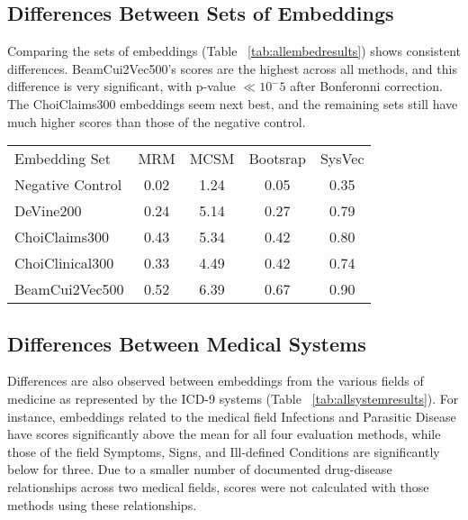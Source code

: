 \documentclass[11pt,a4paper]{article}
\begin{document}
\subsection{Differences Between Sets of Embeddings}
Comparing the sets of embeddings (Table ~\ref{tab:allembedresults}) shows consistent differences. BeamCui2Vec500's scores are the highest across all methods, and this difference is very significant, with p-value $\ll 10^-5$ after Bonferonni correction. The ChoiClaims300 embeddings seem next best, and the remaining sets still have much higher scores than those of the negative control. 


\begin{table*}[h]
	\begin{center}
		\begin{tabular}{l|c|c|c|c}
			Embedding Set &MRM 	        &MCSM              &Bootsrap 	  &SysVec \\
			\hlineB{4}
			Negative Control& 0.02 & 1.24 & 0.05 & 0.35 \\	            
			DeVine200       & 0.24 & 5.14 &	0.27 & 0.79 \\
			ChoiClaims300   & 0.43 & 5.34 &	0.42 & 0.80 \\ 
			ChoiClinical300	& 0.33 & 4.49 &	0.42 & 0.74 \\
			BeamCui2Vec500	& 0.52 & 6.39 & 0.67 & 0.90 \\
		\end{tabular}
		\caption{Mean scores for embedding sets for each evaluation method. See Methods section for abbreviations}
		\label{tab:allembedresults}
	\end{center}
	
\end{table*}


\subsection{Differences Between Medical Systems}

Differences are also observed between embeddings from the various fields of medicine as represented by the ICD-9 systems (Table ~\ref{tab:allsystemresults}). For instance, embeddings related to the medical field Infections and Parasitic Disease have scores significantly above the mean for all four evaluation methods, while those of the field Symptoms, Signs, and Ill-defined Conditions are significantly below for three. Due to a smaller number of documented drug-disease relationships across two medical fields, scores were not calculated with those methods using these relationships.  
\end{document}
